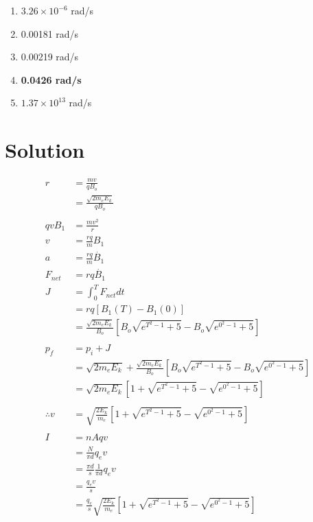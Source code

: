 \begin{enumerate}[label=\uppercase\alph*)]
  \item $3.26 \times 10^{-6}$ rad/s
  \item 0.00181 rad/s
  \item 0.00219 rad/s
  \item \textbf{0.0426 rad/s}
  \item $1.37 \times 10^{13}$ rad/s
\end{enumerate}

\section{Solution}

\begin{align*}
r &= \frac{mv}{qB_o} \\
&= \frac{\sqrt{2m_eE_k}}{qB_o} \\
\\
qvB_1 &= \frac{mv^2}{r} \\
v &= \frac{rq}{m}B_1 \\
a &= \frac{rq}{m}\dot{B_1} \\
F_{net} &= rq\dot{B_1} \\
J &= \int_0^T F_{net} dt \\
&= rq[B_1(T) - B_1(0)] \\
&= \frac{\sqrt{2m_eE_k}}{B_o}[B_o\sqrt{e^{T^2-1}+5} - B_o\sqrt{e^{0^2-1}+5}] \\
\\
p_f &= p_i + J \\
&= \sqrt{2m_eE_k} + \frac{\sqrt{2m_eE_k}}{B_o}[B_o\sqrt{e^{T^2-1}+5} - B_o\sqrt{e^{0^2-1}+5}] \\
&= \sqrt{2m_eE_k} [1 + \sqrt{e^{T^2-1}+5} - \sqrt{e^{0^2-1}+5}]\\
\\
\therefore v &= \sqrt{\frac{2E_k}{m_e}} [1 + \sqrt{e^{T^2-1}+5} - \sqrt{e^{0^2-1}+5}] \\
\\
I &= nAqv \\
&= \frac{N}{\pi d}q_ev \\
&= \frac{\pi d}{s} \frac{1}{\pi d} q_ev \\
&= \frac{q_ev}{s} \\
&= \frac{q_e}{s}\sqrt{\frac{2E_k}{m_e}} [1 + \sqrt{e^{T^2-1}+5} - \sqrt{e^{0^2-1}+5}]
\end{align*}

